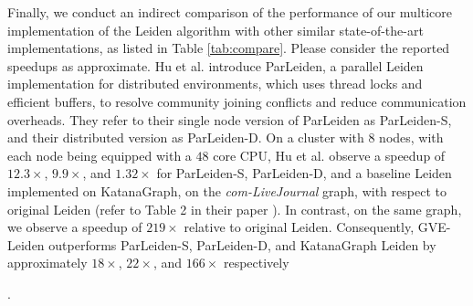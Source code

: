 Finally, we conduct an indirect comparison of the performance of our multicore implementation of the Leiden algorithm with other similar state-of-the-art implementations, as listed in Table \ref{tab:compare}. Please consider the reported speedups as approximate. Hu et al. \cite{huparleiden} introduce ParLeiden, a parallel Leiden implementation for distributed environments, which uses thread locks and efficient buffers, to resolve community joining conflicts and reduce communication overheads. They refer to their single node version of ParLeiden as ParLeiden-S, and their distributed version as ParLeiden-D. On a cluster with $8$ nodes, with each node being equipped with a $48$ core CPU, Hu et al. observe a speedup of $12.3\times$, $9.9\times$, and $1.32\times$ for ParLeiden-S, ParLeiden-D, and a baseline Leiden implemented on KatanaGraph, on the \textit{com-LiveJournal} graph, with respect to original Leiden \cite{com-traag19} (refer to Table 2 in their paper \cite{huparleiden}). In contrast, on the same graph, we observe a speedup of $219\times$ relative to original Leiden. Consequently, GVE-Leiden outperforms ParLeiden-S, ParLeiden-D, and KatanaGraph Leiden by approximately $18\times$, $22\times$, and $166\times$ respectively.
